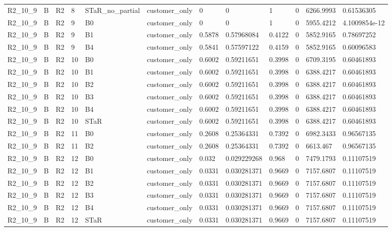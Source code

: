 \begin{longtable}{llllllllllll}
R2\_10\_9 & B & R2 & 8 & STaR\_no\_partial & customer\_only & 0 & 0 & 1 & 0 & 6266.9993 & 0.61536305 \\
R2\_10\_9 & B & R2 & 9 & B0 & customer\_only & 0 & 0 & 1 & 0 & 5955.4212 & 4.1009854e-12 \\
R2\_10\_9 & B & R2 & 9 & B1 & customer\_only & 0.5878 & 0.57968084 & 0.4122 & 0 & 5852.9165 & 0.78697252 \\
R2\_10\_9 & B & R2 & 9 & B4 & customer\_only & 0.5841 & 0.57597122 & 0.4159 & 0 & 5852.9165 & 0.60096583 \\
R2\_10\_9 & B & R2 & 10 & B0 & customer\_only & 0.6002 & 0.59211651 & 0.3998 & 0 & 6709.3195 & 0.60461893 \\
R2\_10\_9 & B & R2 & 10 & B1 & customer\_only & 0.6002 & 0.59211651 & 0.3998 & 0 & 6388.4217 & 0.60461893 \\
R2\_10\_9 & B & R2 & 10 & B2 & customer\_only & 0.6002 & 0.59211651 & 0.3998 & 0 & 6388.4217 & 0.60461893 \\
R2\_10\_9 & B & R2 & 10 & B3 & customer\_only & 0.6002 & 0.59211651 & 0.3998 & 0 & 6388.4217 & 0.60461893 \\
R2\_10\_9 & B & R2 & 10 & B4 & customer\_only & 0.6002 & 0.59211651 & 0.3998 & 0 & 6388.4217 & 0.60461893 \\
R2\_10\_9 & B & R2 & 10 & STaR & customer\_only & 0.6002 & 0.59211651 & 0.3998 & 0 & 6388.4217 & 0.60461893 \\
R2\_10\_9 & B & R2 & 11 & B0 & customer\_only & 0.2608 & 0.25364331 & 0.7392 & 0 & 6982.3433 & 0.96567135 \\
R2\_10\_9 & B & R2 & 11 & B2 & customer\_only & 0.2608 & 0.25364331 & 0.7392 & 0 & 6613.467 & 0.96567135 \\
R2\_10\_9 & B & R2 & 12 & B0 & customer\_only & 0.032 & 0.029229268 & 0.968 & 0 & 7479.1793 & 0.11107519 \\
R2\_10\_9 & B & R2 & 12 & B1 & customer\_only & 0.0331 & 0.030281371 & 0.9669 & 0 & 7157.6807 & 0.11107519 \\
R2\_10\_9 & B & R2 & 12 & B2 & customer\_only & 0.0331 & 0.030281371 & 0.9669 & 0 & 7157.6807 & 0.11107519 \\
R2\_10\_9 & B & R2 & 12 & B3 & customer\_only & 0.0331 & 0.030281371 & 0.9669 & 0 & 7157.6807 & 0.11107519 \\
R2\_10\_9 & B & R2 & 12 & B4 & customer\_only & 0.0331 & 0.030281371 & 0.9669 & 0 & 7157.6807 & 0.11107519 \\
R2\_10\_9 & B & R2 & 12 & STaR & customer\_only & 0.0331 & 0.030281371 & 0.9669 & 0 & 7157.6807 & 0.11107519 \\

\end{longtable}
